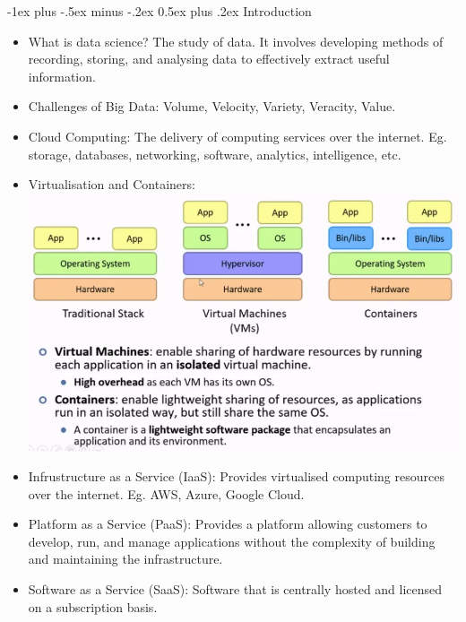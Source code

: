 \documentclass[10pt, landscape]{article}
\makeatletter
\renewcommand{\section}{\@startsection{section}{1}{0mm}%
  {-1ex plus -.5ex minus -.2ex}%
  {0.5ex plus .2ex}%
{\normalfont\large\bfseries}}
\makeatother
\begin{document}
\raggedright
\footnotesize
\begin{multicols*}{4}
  \setlength{\columnseprule}{0.25pt}

  \begin{center}
  \end{center}


  \section{Introduction}

  \begin{itemize}
    \item What is data science? The study of data. It involves developing methods of recording, storing, and analysing data to effectively extract useful information.
    \item Challenges of Big Data: Volume, Velocity, Variety, Veracity, Value.
    \item Cloud Computing: The delivery of computing services over the internet. Eg. storage, databases, networking, software, analytics, intelligence, etc.
    \item Virtualisation and Containers: \includegraphics[width=0.95\linewidth]{virtualisation_container.png}
    \item Infrustructure as a Service (IaaS): Provides virtualised computing resources over the internet. Eg. AWS, Azure, Google Cloud.
    \item Platform as a Service (PaaS): Provides a platform allowing customers to develop, run, and manage applications without the complexity of building and maintaining the infrastructure.
    \item Software as a Service (SaaS): Software that is centrally hosted and licensed on a subscription basis.
  \end{itemize}


\end{multicols*}
\end{document}
